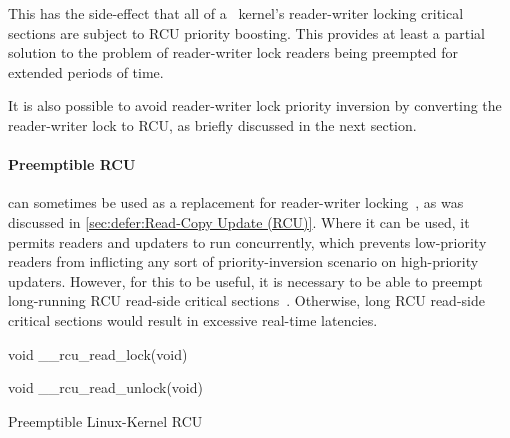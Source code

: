 This has the side-effect that all of a \rt\ kernel's reader-writer locking
critical sections are subject to RCU priority boosting.
This provides at least a partial solution to the problem of reader-writer
lock readers being preempted for extended periods of time.

It is also possible to avoid reader-writer lock priority inversion by
converting the reader-writer lock to RCU, as briefly discussed in the
next section.

\paragraph{Preemptible RCU}
can sometimes be used as a replacement for reader-writer
locking~\cite{PaulEMcKenney2007WhatIsRCUFundamentally,PaulMcKenney2012RCUUsage,PaulEMcKenney2014RCUAPI},
as was discussed in \cref{sec:defer:Read-Copy Update (RCU)}.
Where it can be used, it permits readers and updaters to run concurrently,
which prevents low-priority readers from inflicting any sort of
priority-inversion scenario on high-priority updaters.
However, for this to be useful, it is necessary to be able to preempt
long-running RCU read-side critical
sections~\cite{DinakarGuniguntala2008IBMSysJ}.
Otherwise, long RCU read-side critical sections would result in
excessive real-time latencies.

\begin{listing}[tb]
\begin{fcvlabel}
\begin{VerbatimL}[commandchars=\\\[\]]
void __rcu_read_lock(void)									\lnlbl[lock:e]

void __rcu_read_unlock(void)		        						\lnlbl[unl:e]
\end{VerbatimL}
\end{fcvlabel}
\caption{Preemptible Linux-Kernel RCU}
\label{lst:advsync:Preemptible Linux-Kernel RCU}
\end{listing}

